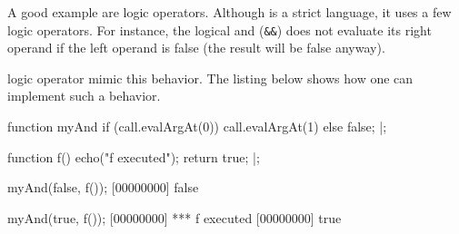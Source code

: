 A good example are logic operators. Although \Cxx is a strict
language, it uses a few logic operators. For instance, the logical and
(\lstinline{&&}) does not evaluate its right operand if the left
operand is false (the result will be false anyway).

\us logic operator mimic this behavior. The listing below shows how
one can implement such a behavior.

\begin{urbiscript}
function myAnd
{
  if (call.evalArgAt(0))
    call.evalArgAt(1)
  else
    false;
}|;

function f()
{
  echo("f executed");
  return true;
}|;

myAnd(false, f());
[00000000] false

myAnd(true, f());
[00000000] *** f executed
[00000000] true
\end{urbiscript}



